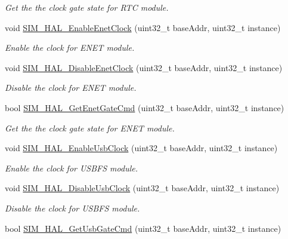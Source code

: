 \begin{DoxyCompactItemize}
\begin{DoxyCompactList}\small\item\em Get the the clock gate state for R\+TC module. \end{DoxyCompactList}\item 
void \hyperlink{group__sim__hal_ga0da539fb4461c69d84fa89720bfc92b7}{S\+I\+M\+\_\+\+H\+A\+L\+\_\+\+Enable\+Enet\+Clock} (uint32\+\_\+t base\+Addr, uint32\+\_\+t instance)
\begin{DoxyCompactList}\small\item\em Enable the clock for E\+N\+ET module. \end{DoxyCompactList}\item 
void \hyperlink{group__sim__hal_gaf5314ebda678ce04ab629c9372adac23}{S\+I\+M\+\_\+\+H\+A\+L\+\_\+\+Disable\+Enet\+Clock} (uint32\+\_\+t base\+Addr, uint32\+\_\+t instance)
\begin{DoxyCompactList}\small\item\em Disable the clock for E\+N\+ET module. \end{DoxyCompactList}\item 
bool \hyperlink{group__sim__hal_gab23f01dfcdaa0bd5984225b41adbdf62}{S\+I\+M\+\_\+\+H\+A\+L\+\_\+\+Get\+Enet\+Gate\+Cmd} (uint32\+\_\+t base\+Addr, uint32\+\_\+t instance)
\begin{DoxyCompactList}\small\item\em Get the the clock gate state for E\+N\+ET module. \end{DoxyCompactList}\item 
void \hyperlink{group__sim__hal_gabee3ac4975c8a018c2fa6cec8fd10989}{S\+I\+M\+\_\+\+H\+A\+L\+\_\+\+Enable\+Usb\+Clock} (uint32\+\_\+t base\+Addr, uint32\+\_\+t instance)
\begin{DoxyCompactList}\small\item\em Enable the clock for U\+S\+B\+FS module. \end{DoxyCompactList}\item 
void \hyperlink{group__sim__hal_ga89f7d9bd64a1999da46955bba3eaf1a2}{S\+I\+M\+\_\+\+H\+A\+L\+\_\+\+Disable\+Usb\+Clock} (uint32\+\_\+t base\+Addr, uint32\+\_\+t instance)
\begin{DoxyCompactList}\small\item\em Disable the clock for U\+S\+B\+FS module. \end{DoxyCompactList}\item 
bool \hyperlink{group__sim__hal_ga4c5b1708ef4152c1508f0b407df06c9c}{S\+I\+M\+\_\+\+H\+A\+L\+\_\+\+Get\+Usb\+Gate\+Cmd} (uint32\+\_\+t base\+Addr, uint32\+\_\+t instance)

\end{DoxyCompactItemize}
